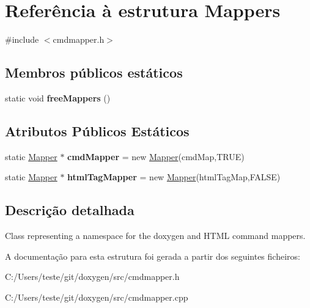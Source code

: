 \hypertarget{struct_mappers}{\section{Referência à estrutura Mappers}
\label{struct_mappers}
}


{\ttfamily \#include $<$cmdmapper.\-h$>$}

\subsection*{Membros públicos estáticos}
\begin{DoxyCompactItemize}
\item 
\hypertarget{struct_mappers_ab39643bb8c42ccfd73dbba2ae92405f7}{static void {\bfseries free\-Mappers} ()}\label{struct_mappers_ab39643bb8c42ccfd73dbba2ae92405f7}

\end{DoxyCompactItemize}
\subsection*{Atributos Públicos Estáticos}
\begin{DoxyCompactItemize}
\item 
\hypertarget{struct_mappers_a7b95fbbdf33dbea8f36a33b7057b2585}{static \hyperlink{class_mapper}{Mapper} $\ast$ {\bfseries cmd\-Mapper} = new \hyperlink{class_mapper}{Mapper}(cmd\-Map,T\-R\-U\-E)}\label{struct_mappers_a7b95fbbdf33dbea8f36a33b7057b2585}

\item 
\hypertarget{struct_mappers_a4542039e12e4b0ff98f0c3048b872ef8}{static \hyperlink{class_mapper}{Mapper} $\ast$ {\bfseries html\-Tag\-Mapper} = new \hyperlink{class_mapper}{Mapper}(html\-Tag\-Map,F\-A\-L\-S\-E)}\label{struct_mappers_a4542039e12e4b0ff98f0c3048b872ef8}

\end{DoxyCompactItemize}


\subsection{Descrição detalhada}
Class representing a namespace for the doxygen and H\-T\-M\-L command mappers. 

A documentação para esta estrutura foi gerada a partir dos seguintes ficheiros\-:\begin{DoxyCompactItemize}
\item 
C\-:/\-Users/teste/git/doxygen/src/cmdmapper.\-h\item 
C\-:/\-Users/teste/git/doxygen/src/cmdmapper.\-cpp\end{DoxyCompactItemize}
